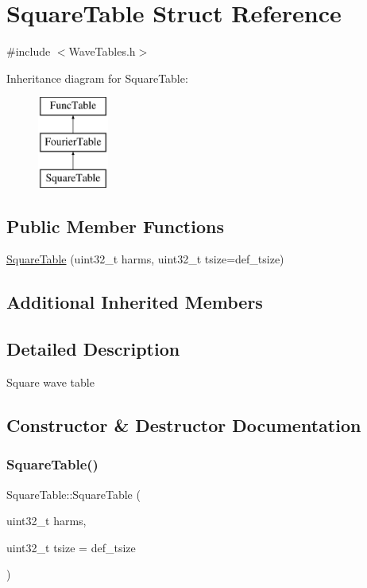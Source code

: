 \hypertarget{struct_square_table}{}\section{Square\+Table Struct Reference}
\label{struct_square_table}


{\ttfamily \#include $<$Wave\+Tables.\+h$>$}

Inheritance diagram for Square\+Table\+:\begin{figure}[H]
\begin{center}
\leavevmode
\includegraphics[height=3.000000cm]{struct_square_table}
\end{center}
\end{figure}
\subsection*{Public Member Functions}
\begin{DoxyCompactItemize}
\item 
\hyperlink{struct_square_table_a4bd437446f86b5440ca3b7e79785770d}{Square\+Table} (uint32\+\_\+t harms, uint32\+\_\+t tsize=def\+\_\+tsize)
\end{DoxyCompactItemize}
\subsection*{Additional Inherited Members}


\subsection{Detailed Description}
Square wave table 

\subsection{Constructor \& Destructor Documentation}
\mbox{\label{struct_square_table_a4bd437446f86b5440ca3b7e79785770d}} 
\subsubsection{\texorpdfstring{Square\+Table()}{SquareTable()}}
{\footnotesize\ttfamily Square\+Table\+::\+Square\+Table (\begin{DoxyParamCaption}\item[{uint32\+\_\+t}]{harms,  }\item[{uint32\+\_\+t}]{tsize = {\ttfamily def\+\_\+tsize} }\end{DoxyParamCaption})\hspace{0.3cm}{\ttfamily [inline]}}

